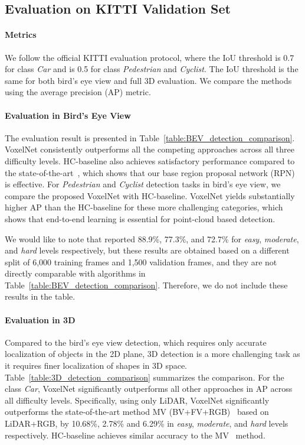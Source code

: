 \documentclass[10pt,twocolumn,letterpaper]{article}
\begin{document}
\subsection{Evaluation on KITTI Validation Set}
\paragraph{Metrics} 
We follow the official KITTI evaluation protocol, where the IoU threshold is 0.7 for class \textit{Car} and is 0.5 for class \textit{Pedestrian} and \textit{Cyclist}. The IoU threshold is the same for both bird's eye view and full 3D evaluation. We compare the methods using the average precision (AP) metric.



\paragraph{Evaluation in Bird's Eye View} 

The evaluation result is presented in Table~\ref{table:BEV_detection_comparison}. VoxelNet consistently outperforms all the competing approaches across all three difficulty levels. HC-baseline also achieves satisfactory performance compared to the state-of-the-art~\cite{REF:cvpr17chen}, which shows that our base region proposal network (RPN) is effective. For \textit{Pedestrian} and \textit{Cyclist} detection tasks in bird's eye view, we compare the proposed VoxelNet with HC-baseline. VoxelNet yields substantially higher AP than the HC-baseline for these more challenging categories, which shows that end-to-end learning is essential for point-cloud based detection.

We would like to note that \cite{REF:3DFCN} reported 88.9\%, 77.3\%, and 72.7\% for \textit{easy}, \textit{moderate}, and \textit{hard} levels respectively, but these results are obtained based on a different split of 6,000 training frames and 1,500 validation frames, and they are not directly comparable with algorithms in Table~\ref{table:BEV_detection_comparison}. Therefore, we do not include these results in the table.


\paragraph{Evaluation in 3D}
Compared to the bird's eye view detection, which requires only accurate localization of objects in the 2D plane, 3D detection is a more challenging task as it requires finer localization of shapes in 3D space. Table~\ref{table:3D_detection_comparison} summarizes the  comparison. For the class \textit{Car}, VoxelNet significantly outperforms all other approaches in AP across all difficulty levels. Specifically, using only LiDAR, VoxelNet significantly outperforms the state-of-the-art method MV (BV+FV+RGB)~\cite{REF:cvpr17chen} based on LiDAR+RGB, by 10.68\%, 2.78\% and 6.29\% in \textit{easy}, \textit{moderate}, and \textit{hard} levels respectively. HC-baseline achieves similar accuracy to the MV~\cite{REF:cvpr17chen} method.
\end{document}

